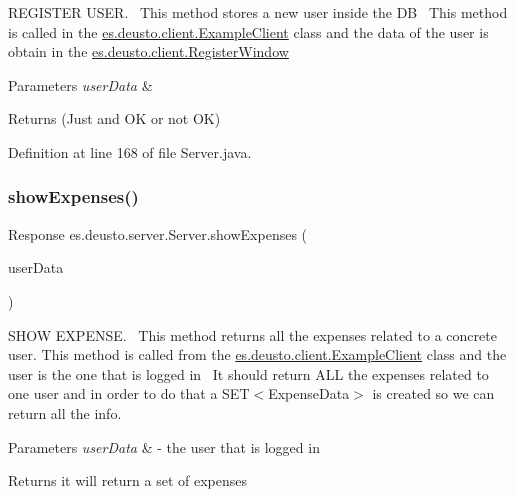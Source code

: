 R\+E\+G\+I\+S\+T\+ER U\+S\+ER.~\newline
This method stores a new user inside the DB~\newline
This method is called in the \hyperlink{classes_1_1deusto_1_1client_1_1_example_client}{es.\+deusto.\+client.\+Example\+Client} class and the data of the user is obtain in the \hyperlink{classes_1_1deusto_1_1client_1_1_register_window}{es.\+deusto.\+client.\+Register\+Window}~\newline
 
\begin{DoxyParams}{Parameters}
{\em user\+Data} & \\
\hline
\end{DoxyParams}
\begin{DoxyReturn}{Returns}
(Just and OK or not OK) 
\end{DoxyReturn}


Definition at line 168 of file Server.\+java.

\mbox{\label{classes_1_1deusto_1_1server_1_1_server_aa28b04cc2643cf60072fc2a680288cde}} 
\subsubsection{\texorpdfstring{show\+Expenses()}{showExpenses()}}
{\footnotesize\ttfamily Response es.\+deusto.\+server.\+Server.\+show\+Expenses (\begin{DoxyParamCaption}\item[{\hyperlink{classes_1_1deusto_1_1serialization_1_1_user_data}{User\+Data}}]{user\+Data }\end{DoxyParamCaption})}

S\+H\+OW E\+X\+P\+E\+N\+SE.~\newline
This method returns all the expenses related to a concrete user. This method is called from the \hyperlink{classes_1_1deusto_1_1client_1_1_example_client}{es.\+deusto.\+client.\+Example\+Client} class and the user is the one that is logged in~\newline
It should return A\+LL the expenses related to one user and in order to do that a S\+E\+T$<$\+Expense\+Data$>$ is created so we can return all the info.


\begin{DoxyParams}{Parameters}
{\em user\+Data} & -\/ the user that is logged in \\
\hline
\end{DoxyParams}
\begin{DoxyReturn}{Returns}
it will return a set of expenses 
\end{DoxyReturn}


